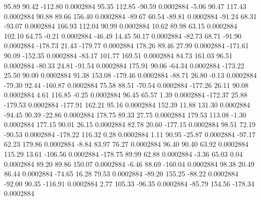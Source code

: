        95.89       90.42     -112.80     0.0002884
       95.35      112.85      -90.59     0.0002884
       -5.06       90.47      117.43     0.0002884
       90.88       89.66      156.40     0.0002884
      -89.67       60.54      -89.81     0.0002884
      -91.24       68.31      -93.07     0.0002884
      166.93      112.04       90.99     0.0002884
       10.62       89.98       63.15     0.0002884
      102.10       64.75       -0.21     0.0002884
      -46.49       14.45       50.17     0.0002884
      -82.73       68.71      -91.90     0.0002884
     -178.73       21.43     -179.77     0.0002884
      178.26       89.46       27.99     0.0002884
     -171.61       90.09     -152.35     0.0002884
      -83.17      101.77      169.51     0.0002884
       84.73      161.03       96.51     0.0002884
      -80.33       24.81      -91.54     0.0002884
      175.91       90.06      -64.34     0.0002884
     -173.22       25.50       90.00     0.0002884
       91.38      153.08     -179.46     0.0002884
      -88.71       26.80       -0.13     0.0002884
      -79.30       92.44     -160.87     0.0002884
       75.58       88.51      -70.54     0.0002884
     -177.26       26.11       90.08     0.0002884
        4.61      116.85       -0.25     0.0002884
       96.45       65.57        1.39     0.0002884
     -172.37       25.88     -179.53     0.0002884
     -177.91      162.21       95.16     0.0002884
      152.39       11.88      131.30     0.0002884
      -94.45       90.39      -22.86     0.0002884
      178.75       89.33       27.75     0.0002884
      179.53      113.08       -1.30     0.0002884
      177.15       90.01       26.15     0.0002884
       82.78       20.60     -177.15     0.0002884
       98.51       72.19      -90.53     0.0002884
     -178.22      116.32        0.28     0.0002884
        1.11       90.95      -25.87     0.0002884
      -97.17       62.23      179.86     0.0002884
       -8.84       83.97       76.27     0.0002884
       96.40       90.40       63.92     0.0002884
      115.29       13.61     -106.56     0.0002884
     -178.75       89.99       62.88     0.0002884
       -3.36       65.03        0.04     0.0002884
       89.20       89.86      150.07     0.0002884
       -6.46       88.69     -160.04     0.0002884
       98.38       20.49       86.44     0.0002884
      -74.65       16.28       79.53     0.0002884
      -89.20      155.25      -88.22     0.0002884
      -92.00       90.35     -116.91     0.0002884
        2.77      105.33      -96.35     0.0002884
      -85.79      154.56     -178.34     0.0002884
